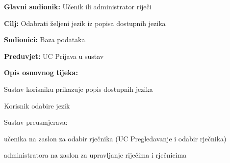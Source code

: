 \noindent {}
\begin{packed_item}

	\item \textbf{Glavni sudionik: } Učenik ili administrator riječi
	\item \textbf{Cilj: } Odabrati željeni jezik iz popisa dostupnih jezika
	\item \textbf{Sudionici: } Baza podataka
	\item \textbf{Preduvjet: } UC Prijava u sustav
	\item  \textbf{Opis osnovnog tijeka:}
	
	\item[] \begin{packed_enum}

		\item Sustav korisniku prikazuje popis dostupnih jezika
		\item Korisnik odabire jezik
		\item Sustav preusmjerava:
		
		\item[] \begin{packed_item}

			\item učenika na zaslon za odabir rječnika (UC Pregledavanje i odabir rječnika)
			\item administratora na zaslon za upravljanje riječima i rječnicima
		
		\end{packed_item}

	\end{packed_enum}
	
\end{packed_item}

